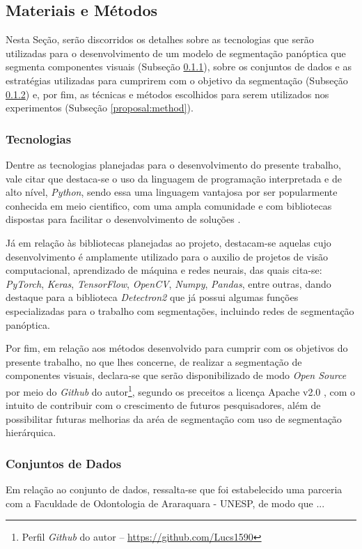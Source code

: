 \subsection{Materiais e Métodos}
\label{proposal:matmet}
Nesta Seção, serão discorridos os detalhes sobre as tecnologias que serão utilizadas para o desenvolvimento de um modelo de segmentação panóptica que segmenta componentes visuais (Subseção \ref{proposal:tec}), sobre os conjuntos de dados e as estratégias utilizadas para cumprirem com o objetivo da segmentação (Subseção \ref{proposal:dataset}) e, por fim, as técnicas e métodos escolhidos para serem utilizados nos experimentos (Subseção \ref{proposal:method}).


\subsubsection{Tecnologias}
\label{proposal:tec}
Dentre as tecnologias planejadas para o desenvolvimento do presente trabalho, vale citar que destaca-se o uso da linguagem de programação interpretada e de alto nível, \textit{Python}, sendo essa uma linguagem vantajosa por ser popularmente conhecida em meio cientifico, com uma ampla comunidade e com  bibliotecas dispostas para facilitar o desenvolvimento de soluções \cite{Millman2011PythonEngineers}.

Já em relação às bibliotecas planejadas ao projeto, destacam-se aquelas cujo desenvolvimento é amplamente utilizado para o auxilio de projetos de visão computacional, aprendizado de máquina e redes neurais, das quais cita-se: \textit{PyTorch}, \textit{Keras}, \textit{TensorFlow}, \textit{OpenCV}, \textit{Numpy}, \textit{Pandas}, entre outras, dando destaque para a biblioteca \textit{Detectron2} \cite{detectron2} que já possui algumas funções especializadas para o trabalho com segmentações, incluindo redes de segmentação panóptica.

Por fim, em relação aos métodos desenvolvido para cumprir com os objetivos do presente trabalho, no que lhes concerne, de realizar a segmentação de componentes visuais, declara-se que serão disponibilizado de modo \textit{Open Source} por meio do \textit{Github} do autor\footnote{Perfil \textit{Github} do autor – \url{https://github.com/Lucs1590}}, segundo os preceitos a licença Apache v2.0 \cite{Licenses}, com o intuito de contribuir com o crescimento de futuros pesquisadores, além de possibilitar futuras melhorias da aréa de segmentação com uso de segmentação hierárquica.


\subsubsection{Conjuntos de Dados}
\label{proposal:dataset}
Em relação ao conjunto de dados, ressalta-se que foi estabelecido uma parceria com a Faculdade de Odontologia de Araraquara - UNESP, de modo que ...

